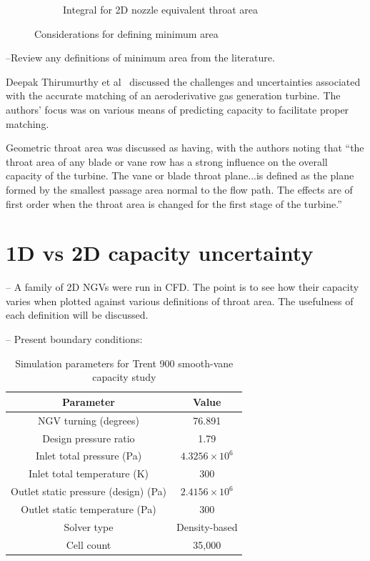 \documentclass[a4paper, 11pt, twoside]{report}
\begin{document}
\begin{figure}[H]
\begin{subfigure}{.45\textwidth}
		\caption{Integral for 2D nozzle equivalent throat area}
		\label{fig:illustration_of_equivalent_throat_area_integral}
	\end{subfigure}
	\caption{Considerations for defining minimum area}
\end{figure}
 		
 --Review any definitions of minimum area from the literature.
 
Deepak Thirumurthy et al~\cite{thirumurthy_throat_area} discussed the challenges and uncertainties associated with the accurate matching of an aeroderivative gas generation turbine. The authors' focus was on various means of predicting capacity to facilitate proper matching. 

Geometric throat area was discussed as having, with the authors noting that ``the throat area of any blade or vane row has a strong influence on the overall capacity of the turbine. The vane or blade throat plane...is defined as the plane formed by the smallest passage area normal to the flow path. The effects are of first order when the throat area is changed for the first stage of the turbine.''


\section{1D vs 2D capacity uncertainty}

-- A family of 2D NGVs were run in CFD. The point is to see how their capacity varies when plotted against various definitions of throat area. The usefulness of each definition will be discussed.

-- Present boundary conditions:
\begin{table}[H]
\caption{Simulation parameters for Trent 900 smooth-vane capacity study}
\label{T900_parameters}
\begin{center}
\begin{tabular}{|c|c|}
\hline
Parameter & Value\\
\hline
NGV turning (degrees) & 76.891\\
Design pressure ratio & 1.79\\
Inlet total pressure (Pa) & $4.3256 \times 10^6$\\
Inlet total temperature (K) & 300\\
Outlet static pressure (design) (Pa) & $2.4156 \times 10^6$\\
Outlet static temperature (Pa) & 300\\
Solver type & Density-based\\
Cell count & 35,000\\
\hline
\end{tabular}
\end{center}
\end{table}
\end{document}
